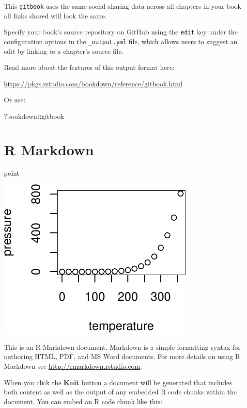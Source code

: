 \documentclass[
]{book}
\newenvironment{Shaded}{\begin{snugshade}}{\end{snugshade}}
\newcommand{\NormalTok}[1]{#1}
\newcommand{\SpecialCharTok}[1]{\textcolor[rgb]{0.81,0.36,0.00}{\textbf{#1}}}
\theoremstyle{definition}
\theoremstyle{definition}
\theoremstyle{definition}
\theoremstyle{definition}
\theoremstyle{remark}
\begin{document}
This \texttt{gitbook} uses the same social sharing data across all chapters in your book- all links shared will look the same.

Specify your book's source repository on GitHub using the \texttt{edit} key under the configuration options in the \texttt{\_output.yml} file, which allows users to suggest an edit by linking to a chapter's source file.

Read more about the features of this output format here:

\url{https://pkgs.rstudio.com/bookdown/reference/gitbook.html}

Or use:

\begin{Shaded}
\begin{Highlighting}[]
\NormalTok{?bookdown}\SpecialCharTok{::}\NormalTok{gitbook}
\end{Highlighting}
\end{Shaded}

\chapter{R Markdown}\label{r-markdown}

point

\includegraphics{_main_files/figure-latex/pressure-plot-1.pdf}

This is an R Markdown document. Markdown is a simple formatting syntax for authoring HTML, PDF, and MS Word documents. For more details on using R Markdown see \url{http://rmarkdown.rstudio.com}.

When you click the \textbf{Knit} button a document will be generated that includes both content as well as the output of any embedded R code chunks within the document. You can embed an R code chunk like this:
\end{document}
